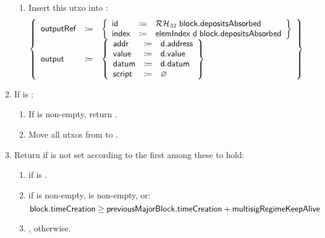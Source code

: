 \documentclass[../hydrozoa.tex]{subfiles}
\begin{document}
\begin{enumerate}
\begin{enumerate}
      \item Insert this utxo into :
        \begin{equation*}
          \left\{
          \begin{array}{lll}
            \mathsf{outputRef} &\coloneq& \left\{
              \begin{array}{lll}
                \mathsf{id} &\coloneq& \mathcal{RH}_{32} \; \mathsf{block.depositsAbsorbed} \\
                \mathsf{index} &\coloneq& \mathsf{elemIndex} \; \mathsf{d} \; \mathsf{block.depositsAbsorbed}
              \end{array}\right\} \\
            \mathsf{output} &\coloneq& \left\{
              \begin{array}{lll}
                \mathsf{addr} &\coloneq& \mathsf{d.address} \\
                \mathsf{value} &\coloneq& \mathsf{d.value} \\
                \mathsf{datum} &\coloneq& \mathsf{d.datum} \\
                \mathsf{script} &\coloneq& \varnothing
              \end{array}\right\}
          \end{array}\right\}
        \end{equation*}
    \end{enumerate}
  \item If  is :
    \begin{enumerate}
      \item If  is non-empty, return .
      \item Move all utxos from  to .
    \end{enumerate}
  \item Return  if  is not set according to the first among these to hold:
    \begin{enumerate}
      \item {} if  is .
      \item {} if  is non-empty,  is non-empty, or:
        \begin{equation*}
          \mathsf{block.timeCreation} \geq \mathsf{previousMajorBlock.timeCreation} + \mathsf{multisigRegimeKeepAlive}
        \end{equation*}
      \item {}, otherwise.

\end{enumerate}
\end{enumerate}
\end{document}
